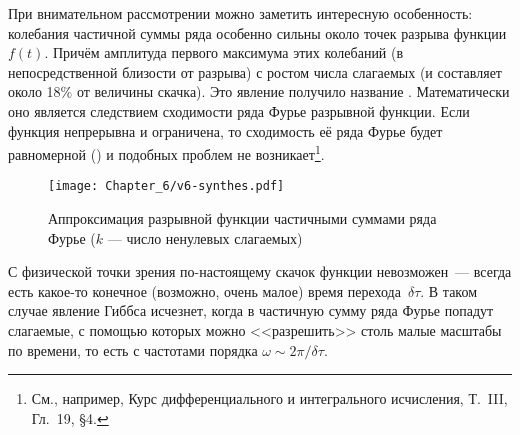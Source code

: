 При внимательном рассмотрении можно заметить интересную особенность:
колебания частичной суммы ряда особенно сильны около точек разрыва
функции $f(t)$. Причём
амплитуда первого максимума этих колебаний (в непосредственной близости от
разрыва)  с ростом числа слагаемых (и составляет около 18\%
от величины скачка). Это явление получило название .
Математически оно является следствием  сходимости ряда
Фурье разрывной функции. Если функция непрерывна и ограничена, то сходимость
её ряда Фурье будет равномерной () и подобных проблем
не возникает\footnote{См., например,
 Курс дифференциального и интегрального исчисления,
Т.~III, Гл.~19, \S4.}.

\begin{figure}[h!]
 \hfill\texttt{[image: Chapter\_6/v6-synthes.pdf]}
 \caption{Аппроксимация разрывной функции частичными суммами ряда Фурье
 ($k$ --- число ненулевых слагаемых)}
\end{figure}

С физической точки зрения по-настоящему  скачок функции
невозможен~--- всегда есть какое-то конечное (возможно, очень малое) время
перехода~$\delta\tau$. В таком случае явление Гиббса исчезнет, когда в
частичную сумму ряда Фурье попадут слагаемые, с помощью которых можно
<<разрешить>> столь малые масштабы по времени, то есть с частотами
порядка $\omega \sim 2\pi /\delta \tau$.

